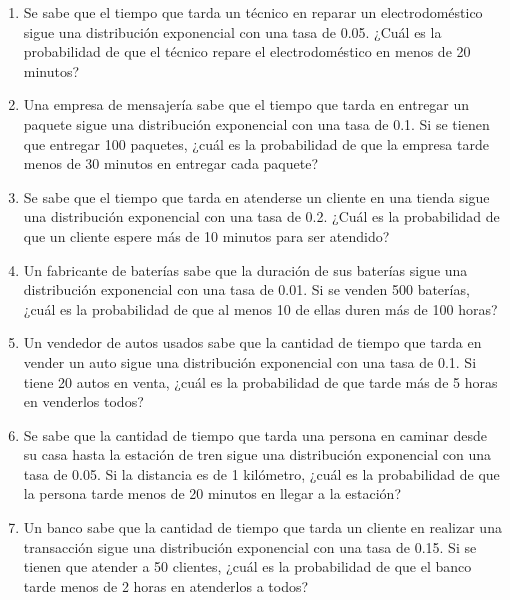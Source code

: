 \begin{Ejer}
\begin{enumerate}
    \item Se sabe que el tiempo que tarda un técnico en reparar un electrodoméstico sigue una distribución exponencial con una tasa de 0.05. ¿Cuál es la probabilidad de que el técnico repare el electrodoméstico en menos de 20 minutos?

    \item Una empresa de mensajería sabe que el tiempo que tarda en entregar un paquete sigue una distribución exponencial con una tasa de 0.1. Si se tienen que entregar 100 paquetes, ¿cuál es la probabilidad de que la empresa tarde menos de 30 minutos en entregar cada paquete?

    \item Se sabe que el tiempo que tarda en atenderse un cliente en una tienda sigue una distribución exponencial con una tasa de 0.2. ¿Cuál es la probabilidad de que un cliente espere más de 10 minutos para ser atendido?

    \item Un fabricante de baterías sabe que la duración de sus baterías sigue una distribución exponencial con una tasa de 0.01. Si se venden 500 baterías, ¿cuál es la probabilidad de que al menos 10 de ellas duren más de 100 horas?

    \item Un vendedor de autos usados sabe que la cantidad de tiempo que tarda en vender un auto sigue una distribución exponencial con una tasa de 0.1. Si tiene 20 autos en venta, ¿cuál es la probabilidad de que tarde más de 5 horas en venderlos todos?

    \item Se sabe que la cantidad de tiempo que tarda una persona en caminar desde su casa hasta la estación de tren sigue una distribución exponencial con una tasa de 0.05. Si la distancia es de 1 kilómetro, ¿cuál es la probabilidad de que la persona tarde menos de 20 minutos en llegar a la estación?

    \item Un banco sabe que la cantidad de tiempo que tarda un cliente en realizar una transacción sigue una distribución exponencial con una tasa de 0.15. Si se tienen que atender a 50 clientes, ¿cuál es la probabilidad de que el banco tarde menos de 2 horas en atenderlos a todos?

\end{enumerate}
\end{Ejer} 


